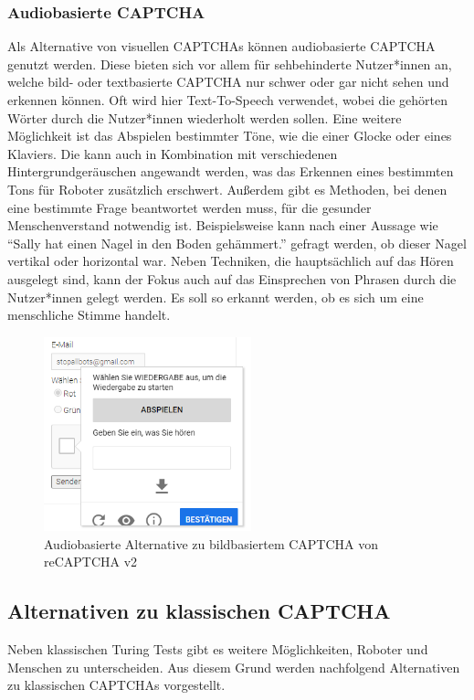 \subsubsection*{Audiobasierte CAPTCHA}
Als Alternative von visuellen CAPTCHAs können audiobasierte CAPTCHA genutzt werden.
Diese bieten sich vor allem für sehbehinderte Nutzer*innen an, welche bild- oder textbasierte CAPTCHA nur schwer oder gar nicht sehen und erkennen können.
Oft wird hier Text-To-Speech verwendet, wobei die gehörten Wörter durch die Nutzer*innen wiederholt werden sollen.
Eine weitere Möglichkeit ist das Abspielen bestimmter Töne, wie die einer Glocke oder eines Klaviers. 
Die kann auch in Kombination mit verschiedenen Hintergrundgeräuschen angewandt werden, was das Erkennen eines bestimmten Tons für Roboter zusätzlich erschwert.
Außerdem gibt es Methoden, bei denen eine bestimmte Frage beantwortet werden muss, für die gesunder Menschenverstand notwendig ist. 
Beispielsweise kann nach einer Aussage wie ``Sally hat einen Nagel in den Boden gehämmert.'' gefragt werden, ob dieser Nagel vertikal oder horizontal war. \cite[p.3]{commonsense}
Neben Techniken, die hauptsächlich auf das Hören ausgelegt sind, kann der Fokus auch auf das Einsprechen von Phrasen durch die Nutzer*innen gelegt werden.
Es soll so erkannt werden, ob es sich um eine menschliche Stimme handelt.
\cite[p.78]{surveyofresearch}

\begin{figure}[h!]
    \centering
    \includegraphics[width=6cm]{gfx/mygraphics/audio.png}
     \caption{Audiobasierte Alternative zu bildbasiertem CAPTCHA von reCAPTCHA v2}
      \label{fig:audio}
\end{figure}

\subsection{Alternativen zu klassischen CAPTCHA}
\label{ch:basics:captcha:alternativen}
Neben klassischen Turing Tests gibt es weitere Möglichkeiten, Roboter und Menschen zu unterscheiden.
Aus diesem Grund werden nachfolgend Alternativen zu klassischen CAPTCHAs vorgestellt.

